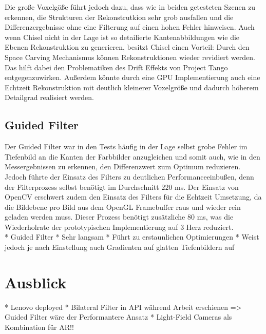 Die große Voxelgöße führt jedoch dazu, dass wie in beiden getesteten Szenen zu erkennen, die Strukturen der Rekonstrutkion sehr grob ausfallen und die Differenzergebnisse ohne eine Filterung auf einen hohen Fehler hinweisen. Auch wenn Chisel nicht in der Lage ist so detailierte Kantenabbildungen wie die Ebenen Rekonstruktion zu generieren, besitzt Chisel einen Vorteil: Durch den Space Carving Mechanismus können Rekonstruktionen wieder revidiert werden. Das hilft dabei den Problematiken des Drift Effekts von Project Tango entgegenzuwirken. Außerdem könnte durch eine GPU Implementierung auch eine Echtzeit Rekonstruktion mit deutlich kleinerer Voxelgröße und dadurch höherem Detailgrad realisiert werden.


\subsection*{Guided Filter}

Der Guided Filter war in den Tests häufig in der Lage selbst grobe Fehler im Tiefenbild an die Kanten der Farbbilder anzugleichen und somit auch, wie in den Messergebnissen zu erkennen, den Differenzwert zum Optimum reduzieren. Jedoch führte der Einsatz des Filters zu deutlichen Performanceeinbußen, denn der Filterprozess selbst benötigt im Durchschnitt \(220\) ms. Der Einsatz von OpenCV erschwert zudem den Einsatz des Filters für die Echtzeit Umsetzung, da die Bildebene pro Bild aus dem OpenGL Framebuffer raus und wieder rein geladen werden muss. Dieser Prozess benötigt zusätzliche \(80\) ms, was die Wiederholrate der prototypischen Implementierung auf 3 Herz reduziert.\\






* Guided Filter
	* Sehr langsam
	* Führt zu erstaunlichen Optimierungen
	* Weist jedoch je nach Einstellung auch Gradienten auf glatten Tiefenbildern auf


\section{Ausblick}

* Lenovo deployed
* Bilateral Filter in API während Arbeit erschienen => Guided Filter wäre der Performantere Ansatz
* Light-Field Cameras als Kombination für AR!!


	
	